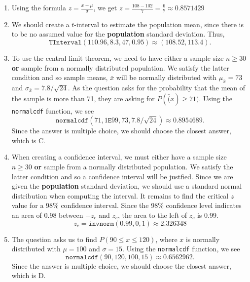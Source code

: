 \documentclass{article}
\newcommand{\answer}[1]{{\color{red}{\large \textbf{#1}}}}
\begin{document}
\pagestyle{myheadings}

\begin{center}
\textbf{}
\end{center}

\begin{enumerate}

\item \answer{A} Using the formula $z=\frac{x-\mu}{\sigma}$, we get $z = \frac{108-102}{7}=\frac{6}{7} \approx 0.8571429$

\item \answer{D} We should create a $t$-interval to estimate the population mean, since there is to be no assumed value for the \textbf{population} standard deviation. Thus, 
$$\texttt{TInterval}(110.96,8.3,47,0.95) \approx (108.52, 113.4).$$

\item \answer{C} To use the central limit theorem, we need to have either a sample size $n\geq 30$ \textbf{or} sample from a normally distributed population. We satisfy the latter condition and so sample means, $\bar{x}$ will be normally distributed with $\mu_{\bar{x}} = 73$ and $\sigma_{\bar{x}} = 7.8/\sqrt{24}$. As the question asks for the probability that the mean of the sample is more than 71, they are asking for $P(\bar(x) \geq 71)$. Using the \texttt{normalcdf} function, we see
$$\texttt{normalcdf}( 71, 1\texttt{E}99, 73, 7.8/\sqrt{24} ) \approx 0.8954689.$$
Since the answer is multiple choice, we should choose the closest answer, which is C.

\item \answer{C} When creating a confidence interval, we must either have a sample size $n\geq 30$ \textbf{or} sample from a normally distributed population. We satisfy the latter condition and so a confidence interval will be justfied. Since we are given the \textbf{population} standard deviation, we should use a standard normal distribution when computing the interval. It remains to find the critical $z$ value for a 98\% confidence interval. Since the 98\% confidence level indicates an area of 0.98 between $-z_c$ and $z_c$, the area to the left of $z_c$ is 0.99.
$$z_c = \texttt{invnorm}(0.99,0,1) \approx 2.326348$$

\item \answer{D} The question asks us to find $P(90 \leq x \leq 120)$, where $x$ is normally distributed with $\mu = 100$ and $\sigma = 15$. Using the \texttt{normalcdf} function, we see $$\texttt{normalcdf}(90, 120, 100, 15) \approx 0.6562962.$$ Since the answer is multiple choice, we should choose the closest answer, which is D.


\end{enumerate}
\end{document}
